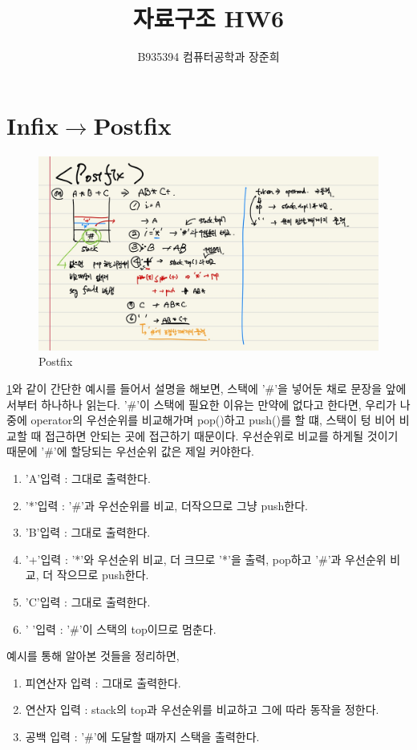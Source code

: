 \documentclass[a4paper,11pt]{article}
\begin{document}
\title{자료구조 HW6}
\author{B935394 컴퓨터공학과 장준희}
\maketitle
\newpage
\section{Infix$\rightarrow$Postfix}
\begin{figure}[h]
\begin{center}
\includegraphics[width=\textwidth]{postfix}
\caption{Postfix}
\label{fig:fig1}
\end{center}
\end{figure}
\ref{fig:fig1}와 같이 간단한 예시를 들어서 설명을 해보면, 스택에 '\#'을 넣어둔 채로 문장을 앞에서부터 하나하나 읽는다. '\#'이 스택에 필요한 이유는 만약에 없다고 한다면, 우리가 나중에 operator의 우선순위를 비교해가며 pop()하고 push()를 할 떄, 스택이 텅 비어 비교할 때 접근하면 안되는 곳에 접근하기 때문이다. 우선순위로 비교를 하게될 것이기 때문에 '\#'에 할당되는 우선순위 값은 제일 커야한다.
\begin{enumerate}
\item 'A'입력 : 그대로 출력한다.
\item '*'입력 : '\#'과 우선순위를 비교, 더작으므로 그냥 push한다.
\item 'B'입력 : 그대로 출력한다.
\item '+'입력 : '*'와 우선순위 비교, 더 크므로 '*'을 출력, pop하고 '\#'과 우선순위 비교, 더 작으므로 push한다.
\item 'C'입력 : 그대로 출력한다.
\item ' '입력 : '\#'이 스택의 top이므로 멈춘다.
\end{enumerate}
\newpage
예시를 통해 알아본 것들을 정리하면,\\
\begin{enumerate}
\item 피연산자 입력 : 그대로 출력한다.
\item 연산자 입력 : stack의 top과 우선순위를 비교하고 그에 따라 동작을 정한다.
\item 공백 입력 : '\#'에 도달할 때까지 스택을 출력한다.\\
\end{enumerate}
\end{document}
